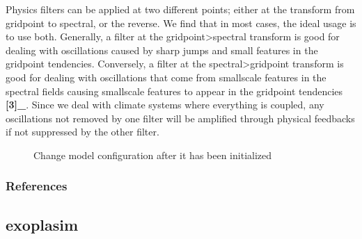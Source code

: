\documentclass[letterpaper,10pt,english]{sphinxmanual}
\begin{document}
\begin{fulllineitems}
\begin{fulllineitems}
Physics filters can be applied at two different points; either at the transform from gridpoint
to spectral, or the reverse. We find that in most cases, the ideal usage is to use both.
Generally, a filter at the gridpoint\sphinxhyphen{}\textgreater{}spectral transform is good for dealing with oscillations
caused by sharp jumps and small features in the gridpoint tendencies. Conversely, a filter
at the spectral\sphinxhyphen{}\textgreater{}gridpoint transform is good for dealing with oscillations that come from
small\sphinxhyphen{}scale features in the spectral fields causing small\sphinxhyphen{}scale features to appear in the
gridpoint tendencies {\color{red}\bfseries{}{[}3{]}\_}. Since we deal with climate systems where everything is coupled,
any oscillations not removed by one filter will be amplified through physical feedbacks if not
suppressed by the other filter.



\begin{description}
\item[{}] \leavevmode
Change model configuration after it has been initialized

\end{description}


\subsubsection*{References}

\end{fulllineitems}


\end{fulllineitems}



\subsection{exoplasim}
\label{\detokenize{source/modules:exoplasim}}\label{\detokenize{source/modules::doc}}

\renewcommand{\indexname}{Python Module Index}
\begin{sphinxtheindex}
\let\bigletter\sphinxstyleindexlettergroup
\bigletter{e}
\item\relax{}
\item\relax{}
\end{sphinxtheindex}

\renewcommand{\indexname}{Index}
\printindex
\end{document}
